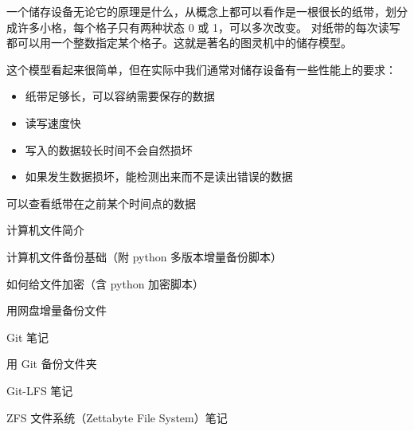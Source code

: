 
\begin{issues}
\issueDraft
\end{issues}

一个储存设备无论它的原理是什么，从概念上都可以看作是一根很长的纸带，划分成许多小格，每个格子只有两种状态 0 或 1，可以多次改变。 对纸带的每次读写都可以用一个整数指定某个格子。这就是著名的图灵机中的储存模型。

这个模型看起来很简单，但在实际中我们通常对储存设备有一些性能上的要求：
\begin{itemize}
\item 纸带足够长，可以容纳需要保存的数据
\item 读写速度快
\item 写入的数据较长时间不会自然损坏
\item 如果发生数据损坏，能检测出来而不是读出错误的数据
\end{itemize}


可以查看纸带在之前某个时间点的数据

计算机文件简介

计算机文件备份基础（附 python 多版本增量备份脚本）

如何给文件加密（含 python 加密脚本）

用网盘增量备份文件

Git 笔记

用 Git 备份文件夹

Git-LFS 笔记

ZFS 文件系统（Zettabyte File System）笔记
